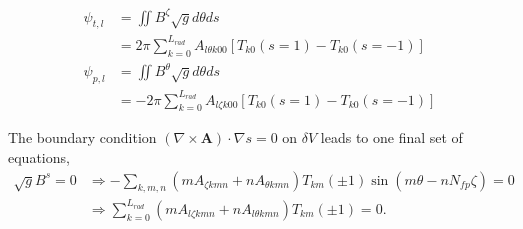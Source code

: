 \begin{align}
	\psi_{t,l} &= \iint B^\zeta \sqrt{g}d\theta ds\\
	&= 2\pi\sum_{k=0}^{L_{rad}} A_{l\theta k 0 0 } [T_{k0}(s=1)-T_{k0}(s=-1)] \\
	\psi_{p,l} &= \iint B^\theta \sqrt{g}d\theta ds\\
	&= -2\pi\sum_{k=0}^{L_{rad}} A_{l\zeta k 0 0 }[T_{k0}(s=1)-T_{k0}(s=-1)]
\end{align}

The boundary condition $(\nabla\times\mathbf{A})\cdot\nabla s =0$ on $\delta V$ leads to one final set of equations,
\begin{align}
	\sqrt{g}B^s=0 &\Rightarrow -\sum_{k,m,n}(m A_{\zeta kmn}+n A_{\theta kmn}) T_{km}(\pm 1)\sin(m\theta-nN_{fp}\zeta) =0\\
	&\Rightarrow \sum_{k=0}^{L_{rad}}(mA_{l\zeta k mn}+ n A_{l\theta k mn})T_{km}(\pm 1) = 0.
\end{align}




